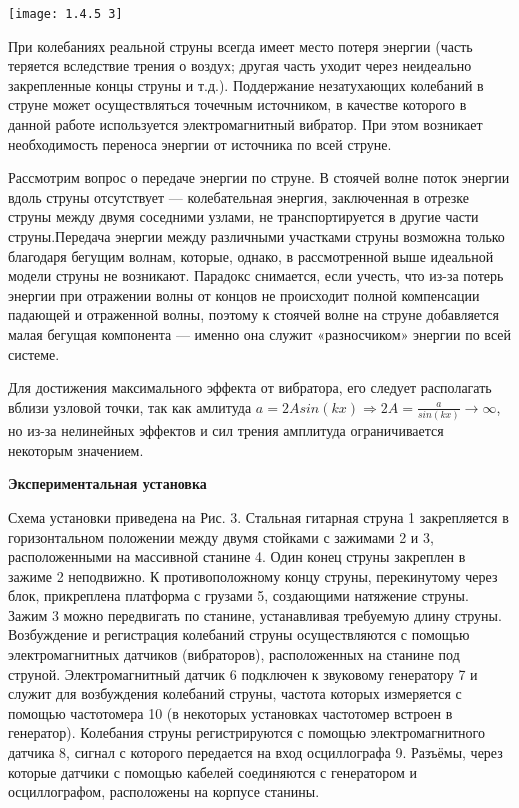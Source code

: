 \documentclass[a4paper,12pt]{article} %
\begin{document}
\texttt{[image: 1.4.5 3]}

При колебаниях реальной струны всегда имеет место потеря энергии
(часть теряется вследствие трения о воздух; другая часть уходит через неидеально закрепленные концы струны и т.д.). Поддержание незатухающих колебаний в струне может осуществляться точечным источником, в качестве которого в данной работе используется электромагнитный вибратор. При этом
возникает необходимость переноса энергии от источника по всей струне.

Рассмотрим вопрос о передаче энергии по струне. В стоячей волне поток
энергии вдоль струны отсутствует — колебательная энергия, заключенная
в отрезке струны между двумя соседними узлами, не транспортируется в другие части струны.Передача энергии между различными участками струны возможна
только благодаря бегущим волнам, которые, однако, в рассмотренной выше
идеальной модели струны не возникают. Парадокс снимается, если учесть,
что из-за потерь энергии при отражении волны от концов не происходит полной компенсации падающей и отраженной волны, поэтому к стоячей волне
на струне добавляется малая бегущая компонента — именно она служит «разносчиком» энергии по всей системе.

Для достижения максимального эффекта от вибратора, его следует располагать вблизи узловой точки, так как амлитуда $a = 2A sin(kx) \Rightarrow 2A = \frac{a}{sin(kx)}\rightarrow \infty$, но из-за нелинейных эффектов и сил трения амплитуда ограничивается некоторым значением.\\


\begin{center}
 \textbf{Экспериментальная установка}
\end{center}

Схема установки приведена на Рис. 3. Стальная гитарная струна 1 закрепляется в горизонтальном положении между двумя стойками с зажимами 2 и 3,
расположенными на массивной станине 4. Один конец струны закреплен в
зажиме 2 неподвижно. К противоположному концу струны, перекинутому через блок, прикреплена платформа с грузами 5, создающими натяжение
струны. Зажим 3 можно передвигать по станине, устанавливая требуемую
длину струны. Возбуждение и регистрация колебаний струны осуществляются с помощью электромагнитных датчиков (вибраторов), расположенных
на станине под струной. Электромагнитный датчик 6 подключен к звуковому
генератору 7 и служит для возбуждения колебаний струны, частота которых
измеряется с помощью частотомера 10 (в некоторых установках частотомер
встроен в генератор). Колебания струны регистрируются с помощью электромагнитного датчика 8, сигнал с которого передается на вход осциллографа 9.
Разъёмы, через которые датчики с помощью кабелей соединяются с генератором и осциллографом, расположены на корпусе станины.
\end{document}

